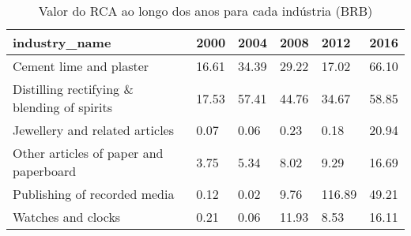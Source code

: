 \begin{table}
\centering
\caption{Valor do RCA ao longo dos anos para cada indústria (BRB)}
\begin{tabular}{p{6cm}p{1.5cm}p{1.5cm}p{1.5cm}p{1.5cm}p{1.5cm}}
\toprule
                              industry\_name &  2000 &  2004 &  2008 &   2012 &  2016 \\
\midrule
                    Cement lime and plaster & 16.61 & 34.39 & 29.22 &  17.02 & 66.10 \\
Distilling rectifying \& blending of spirits & 17.53 & 57.41 & 44.76 &  34.67 & 58.85 \\
             Jewellery and related articles &  0.07 &  0.06 &  0.23 &   0.18 & 20.94 \\
     Other articles of paper and paperboard &  3.75 &  5.34 &  8.02 &   9.29 & 16.69 \\
               Publishing of recorded media &  0.12 &  0.02 &  9.76 & 116.89 & 49.21 \\
                         Watches and clocks &  0.21 &  0.06 & 11.93 &   8.53 & 16.11 \\
\bottomrule
\end{tabular}
\end{table}
